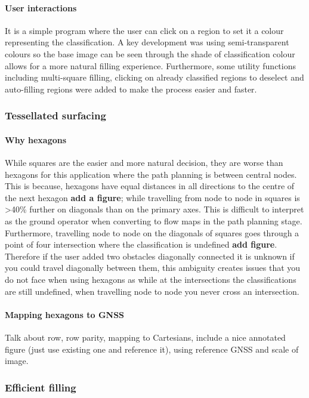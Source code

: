 \paragraph{User interactions}
It is a simple program where the user can click on a region to set it a colour representing the classification. A key development was using semi-transparent colours so the base image can be seen through the shade of classification colour allows for a more natural filling experience. Furthermore, some utility functions including multi-square filling, clicking on already classified regions to deselect and auto-filling regions were added to make the process easier and faster.

\subsubsection{Tessellated surfacing}
\paragraph{Why hexagons} While squares are the easier and more natural decision, they are worse than hexagons for this application where the path planning is between central nodes. This is because, hexagons have equal distances in all directions to the centre of the next hexagon \textbf{add a figure}; while travelling from node to node in squares is >40\% further on diagonals than on the primary axes. This is difficult to interpret as the ground operator when converting to flow maps in the path planning stage. Furthermore, travelling node to node on the diagonals of squares goes through a point of four intersection where the classification is undefined \textbf{add figure}. Therefore if the user added two obstacles diagonally connected it is unknown if you could travel diagonally between them, this ambiguity creates issues that you do not face when using hexagons as while at the intersections the classifications are still undefined, when travelling node to node you never cross an intersection.
\paragraph{Mapping hexagons to \gls{GNSS}}
Talk about row, row parity, mapping to Cartesians, include a nice annotated figure (just use existing one and reference it), using reference \gls{GNSS} and scale of image.

\subsubsection{Efficient filling}
